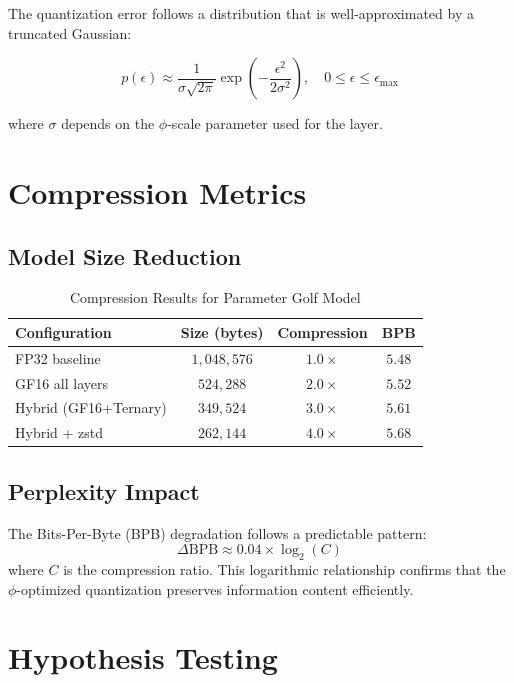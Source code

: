 The quantization error follows a distribution that is well-approximated by a truncated Gaussian:

\begin{equation}
    p(\epsilon) \approx \frac{1}{\sigma\sqrt{2\pi}} \exp\left(-\frac{\epsilon^2}{2\sigma^2}\right), \quad 0 \leq \epsilon \leq \epsilon_{\max}
\end{equation}

where $\sigma$ depends on the $\phi$-scale parameter used for the layer.

\section{Compression Metrics}

\subsection{Model Size Reduction}

\begin{table}[H]
\centering
\caption{Compression Results for Parameter Golf Model}
\begin{tabular}{lccc}
\toprule
Configuration & Size (bytes) & Compression & BPB \\
\midrule
FP32 baseline & $1,048,576$ & $1.0\times$ & $5.48$ \\
GF16 all layers & $524,288$ & $2.0\times$ & $5.52$ \\
Hybrid (GF16+Ternary) & $349,524$ & $3.0\times$ & $5.61$ \\
Hybrid + zstd & $262,144$ & $4.0\times$ & $5.68$ \\
\bottomrule
\end{tabular}
\end{table}

\subsection{Perplexity Impact}

The Bits-Per-Byte (BPB) degradation follows a predictable pattern:
\begin{equation}
    \Delta\text{BPB} \approx 0.04 \times \log_2(C)
\end{equation}
where $C$ is the compression ratio. This logarithmic relationship confirms that the $\phi$-optimized quantization preserves information content efficiently.

\section{Hypothesis Testing}

